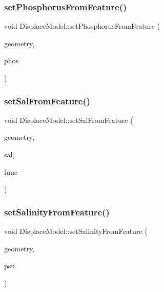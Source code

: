 \mbox{\label{class_displace_model_a630e1ff810ef8f0c2d1bc80f92612b8e}} 
\subsubsection{\texorpdfstring{setPhosphorusFromFeature()}{setPhosphorusFromFeature()}}
{\footnotesize\ttfamily void Displace\+Model\+::set\+Phosphorus\+From\+Feature (\begin{DoxyParamCaption}\item[{O\+G\+R\+Geometry $\ast$}]{geometry,  }\item[{double}]{phos }\end{DoxyParamCaption})}

\mbox{\label{class_displace_model_a8367eebe67878cf29f2e57fa863e1032}} 
\subsubsection{\texorpdfstring{setSalFromFeature()}{setSalFromFeature()}}
{\footnotesize\ttfamily void Displace\+Model\+::set\+Sal\+From\+Feature (\begin{DoxyParamCaption}\item[{O\+G\+R\+Geometry $\ast$}]{geometry,  }\item[{double}]{sal,  }\item[{std\+::function$<$ void(std\+::shared\+\_\+ptr$<$ \mbox{\hyperlink{class_node_data}{Node\+Data}} $>$, int)$>$}]{func }\end{DoxyParamCaption})\hspace{0.3cm}{\ttfamily [protected]}}

\mbox{\label{class_displace_model_aed1c73dea8220eaebb1a424c87e3abcd}} 
\subsubsection{\texorpdfstring{setSalinityFromFeature()}{setSalinityFromFeature()}}
{\footnotesize\ttfamily void Displace\+Model\+::set\+Salinity\+From\+Feature (\begin{DoxyParamCaption}\item[{O\+G\+R\+Geometry $\ast$}]{geometry,  }\item[{double}]{psu }\end{DoxyParamCaption})}

